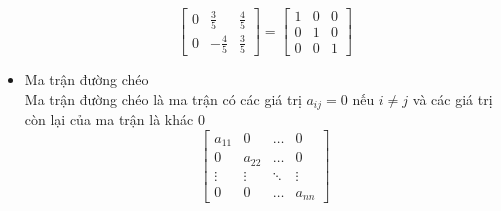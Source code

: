 \begin{itemize}
\[\begin{bmatrix}
    0 & \frac{3}{5} & \frac{4}{5} \\
    0 & -\frac{4}{5} & \frac{3}{5}
    \end{bmatrix} = 
    \begin{bmatrix} 
    1 & 0 & 0 \\
    0 & 1 & 0 \\
    0 & 0 & 1
    \end{bmatrix}
     \]
     \item Ma trận đường chéo\\
     Ma trận đường chéo là ma trận có các giá trị $a_{ij} = 0$ nếu $i \neq j$ và
     các giá trị còn lại của ma trận là khác 0
     \[\begin{bmatrix} 
    a_{11} & 0 & \dots & 0 \\
    0 &  a_{22} & \dots & 0 \\
    \vdots & \vdots & \ddots & \vdots \\
    0 & 0 &  \dots & a_{nn}
    \end{bmatrix}
     \]
\end{itemize}

